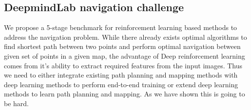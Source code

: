 

\subsection{DeepmindLab navigation challenge}
We propose a 5-stage benchmark for reinforcement learning based methods to address the navigation problem.
While there already exists optimal algorithms to find shortest path between two points and perform optimal navigation between given set of points in a given map, the advantage of Deep reinforcement learning comes from it's ability to extract required features from the input images.
Thus we need to either integrate existing path planning and mapping methods with deep learning methods to perform end-to-end training or extend deep learning methods to learn path planning and mapping.
As we have shown this is going to be hard.

